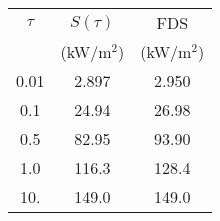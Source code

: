 \begin{center}
\begin{tabular}{|c|c|c|} \hline
$\tau$      & $S(\tau)$   & FDS \\
            & (kW/m$^2$)  & (kW/m$^2$) \\ \hline\hline
0.01        & 2.897       &  2.950  \\
0.1         & 24.94       & 26.98  \\
0.5         & 82.95       & 93.90  \\
1.0         & 116.3       & 128.4  \\
10.         & 149.0       & 149.0  \\ \hline
\end{tabular}
\end{center}
